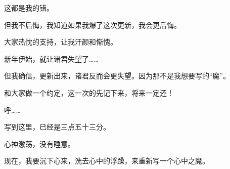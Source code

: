 \begin{this_body}
这都是我的错。

但我不后悔，我知道如果我爆了这次更新，我会更后悔。

大家热忱的支持，让我汗颜和惭愧。

新年伊始，就让诸君失望了……

但我确信，更新出来，诸君反而会更失望。因为那不是我想要写的“魔”。

和大家做一个约定，这一次的先记下来，将来一定还！

呼……

写到这里，已经是三点五十三分。

心神激荡，没有睡意。

现在，我要沉下心来，洗去心中的浮躁，来重新写一个心中之魔。

\end{this_body}

